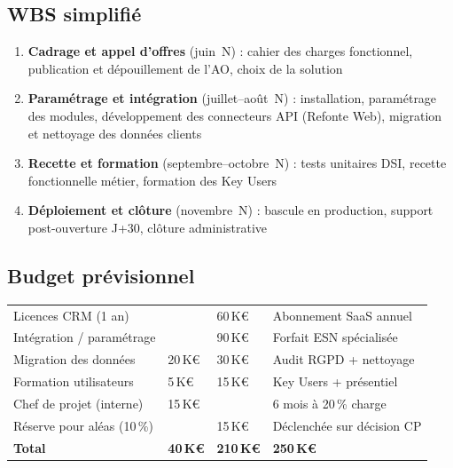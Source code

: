\documentclass[11pt,a4paper,oneside]{report}
\begin{document}
\subsection{WBS simplifié}

\begin{enumerate}
  \item \textbf{Cadrage et appel d'offres} (juin~N) : cahier des charges fonctionnel, publication et dépouillement de l'AO, choix de la solution
  \item \textbf{Paramétrage et intégration} (juillet–août~N) : installation, paramétrage des modules, développement des connecteurs API (Refonte Web), migration et nettoyage des données clients
  \item \textbf{Recette et formation} (septembre–octobre~N) : tests unitaires DSI, recette fonctionnelle métier, formation des Key Users
  \item \textbf{Déploiement et clôture} (novembre~N) : bascule en production, support post-ouverture J+30, clôture administrative
\end{enumerate}

\subsection{Budget prévisionnel}

\begin{center}
\renewcommand{\arraystretch}{1.5}
\begin{tabularx}{\textwidth}{L{5cm} R{2.5cm} R{2.5cm} L{3.8cm}}
\toprule
{}
 &  &  &  \\
\midrule
Licences CRM (1 an)        &         & 60\,K€  & Abonnement SaaS annuel \\
Intégration / paramétrage  &         & 90\,K€  & Forfait ESN spécialisée \\
Migration des données       & 20\,K€ & 30\,K€  & Audit RGPD + nettoyage \\
Formation utilisateurs      &  5\,K€ & 15\,K€  & Key Users + présentiel \\
Chef de projet (interne)    & 15\,K€ &         & 6 mois à 20\,\% charge \\
Réserve pour aléas (10\,\%) &       & 15\,K€  & Déclenchée sur décision CP \\
\midrule
{}
\textbf{Total}              & \textbf{40\,K€} & \textbf{210\,K€} & \textbf{250\,K€} \\
\bottomrule
\end{tabularx}
\end{center}
\end{document}
